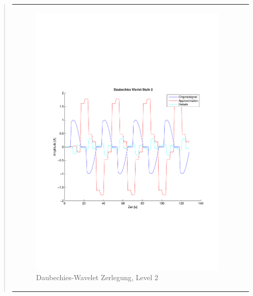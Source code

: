 \begin{quote}
\begin{center}
\begin{tabular}{ll}
\begin{minipage}{0.6\textwidth}
                    \end{minipage}
                    \begin{minipage}{0.6\textwidth}
    
                        \begin{figure}[H]
                            \label{fig:}
                            \includegraphics[scale=0.4, trim = 2cm 6cm 1cm
                            7.5cm,
                            clip]{./Bilder/Termin8/Daubechies_Wavlet_lvl_2}
                            \caption{Daubechies-Wavelet Zerlegung, Level 2}
                        \end{figure}
                    \vspace{-1.5em}
    
                    \end{minipage}
    

\end{tabular}
\end{center}
\end{quote}
